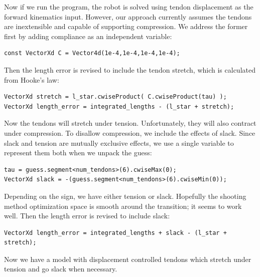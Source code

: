 \documentclass[12pt]{article}
\begin{document}
Now if we run the program, the robot is solved using tendon displacement as the forward kinematics input. However, our approach currently assumes the tendons are inextensible and capable of supporting compression. We address the former first by adding compliance as an independent variable:
\begin{lstlisting}
const VectorXd C = Vector4d(1e-4,1e-4,1e-4,1e-4);
\end{lstlisting}
Then the length error is revised to include the tendon stretch, which is calculated from Hooke's law:
\begin{lstlisting}
VectorXd stretch = l_star.cwiseProduct( C.cwiseProduct(tau) );
VectorXd length_error = integrated_lengths - (l_star + stretch);
\end{lstlisting}
Now the tendons will stretch under tension. Unfortunately, they will also contract under compression. 
To disallow compression, we include the effects of slack. Since slack and tension are mutually exclusive effects, we use a single variable to represent them both when we unpack the guess:
\begin{lstlisting}
tau = guess.segment<num_tendons>(6).cwiseMax(0);
VectorXd slack = -(guess.segment<num_tendons>(6).cwiseMin(0));
\end{lstlisting}
Depending on the sign, we have either tension or slack. Hopefully the shooting method optimization space is smooth around the transition; it seems to work well. Then the length error is revised to include slack:
\begin{lstlisting}
VectorXd length_error = integrated_lengths + slack - (l_star + stretch);
\end{lstlisting}
Now we have a model with displacement controlled tendons which stretch under tension and go slack when necessary.
\end{document}
